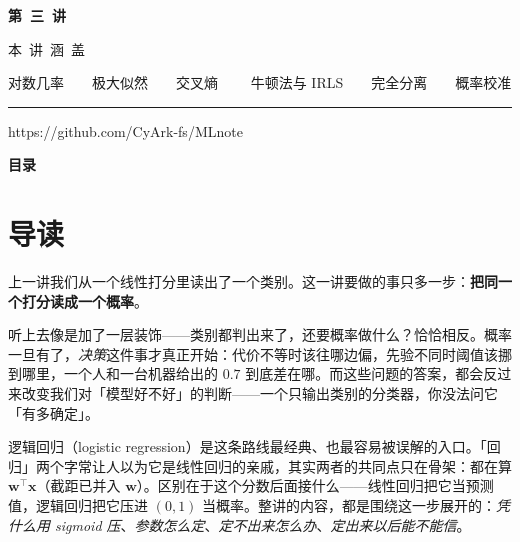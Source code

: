 \documentclass[11pt,a4paper,fontset=windows,zihao=-4]{ctexart}
\makeatletter
\newcommand{\bw}{\mathbf{w}}
\newcommand{\bx}{\mathbf{x}}
\newcommand{\tp}{^{\top}}
\renewcommand{\tableofcontents}{%
  \par\begingroup
    \sffamily\Large\bfseries\color{navy}目\quad 录\par
  \endgroup
  \vspace{0.85em}
  \setlength{\parskip}{0pt}%
  \@starttoc{toc}%
}
\makeatother
\begin{document}
\begin{titlepage}
\vspace*{3.10cm}
{\color{goldlight}\sffamily\bfseries\Large 第\ 三\ 讲\par}
\vspace{1.05cm}
{\color{steel}\sffamily\footnotesize 本\ 讲\ 涵\ 盖\par}
\vspace{0.26cm}
{\color{grey}\footnotesize 对数几率\ \ \textperiodcentered\ \ 极大似然\ \ \textperiodcentered\ \ 交叉熵
 \ \ \textperiodcentered\ \ 牛顿法与 IRLS\ \ \textperiodcentered\ \ 完全分离\ \ \textperiodcentered\ \ 概率校准\par}

\vspace{3.55cm}
{\color{navy!30}\rule{3.0cm}{0.4pt}\par}
\vspace{0.32cm}
{\color{grey}\footnotesize https://github.com/CyArk-fs/MLnote\par}
\end{titlepage}

\setcounter{page}{1}

\tableofcontents
\thispagestyle{plain}
\clearpage

\setcounter{page}{1}

\section*{导\quad 读}

上一讲我们从一个线性打分里读出了一个类别。这一讲要做的事只多一步：\textbf{把同一个打分读成一个概率}。

听上去像是加了一层装饰——类别都判出来了，还要概率做什么？恰恰相反。概率一旦有了，\emph{决策}这件事才真正开始：代价不等时该往哪边偏，先验不同时阈值该挪到哪里，一个人和一台机器给出的 $0.7$ 到底差在哪。而这些问题的答案，都会反过来改变我们对「模型好不好」的判断——一个只输出类别的分类器，你没法问它「有多确定」。

逻辑回归（logistic regression）是这条路线最经典、也最容易被误解的入口。「回归」两个字常让人以为它是线性回归的亲戚，其实两者的共同点只在骨架：都在算 $\bw\tp\bx$（截距已并入 $\bw$）。区别在于这个分数后面接什么——线性回归把它当预测值，逻辑回归把它压进 $(0,1)$ 当概率。整讲的内容，都是围绕这一步展开的：\emph{凭什么用 sigmoid 压}、\emph{参数怎么定}、\emph{定不出来怎么办}、\emph{定出来以后能不能信}。
\end{document}
